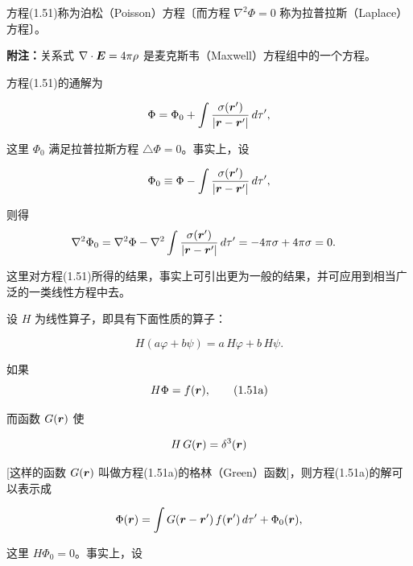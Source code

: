 方程(1.51)称为泊松（Poisson）方程〔而方程 $\nabla^{2}\Phi = 0$ 称为拉普拉斯（Laplace）方程〕。

\textbf{附注：}关系式 $\nabla \cdot \bm{E} = 4\pi\rho$ 是麦克斯韦（Maxwell）方程组中的一个方程。

方程(1.51)的通解为

\begin{equation*}
\Phi = \Phi_0 + \int \frac{\sigma(\bm{r}')}{|\bm{r} - \bm{r}'|}\, d\tau',
\end{equation*}

这里 $\Phi_0$ 满足拉普拉斯方程 $\triangle\Phi = 0$。事实上，设

\begin{equation*}
\Phi_0 \equiv \Phi - \int \frac{\sigma(\bm{r}')}{|\bm{r} - \bm{r}'|}\, d\tau',
\end{equation*}

则得
\begin{equation*}
\begin{aligned}
\nabla^{2}\Phi_0 &= \nabla^{2}\Phi - \nabla^{2} \int \frac{\sigma(\bm{r}')}{|\bm{r} - \bm{r}'|}\, d\tau' = -4\pi\sigma + 4\pi\sigma = 0.
\end{aligned}
\end{equation*}

这里对方程(1.51)所得的结果，事实上可引出更为一般的结果，并可应用到相当广泛的一类线性方程中去。

设 $H$ 为线性算子，即具有下面性质的算子：

\begin{equation*}
H(a\varphi + b\psi) = a\, H\varphi + b\, H\psi.
\end{equation*}

如果
\begin{equation}
H\Phi = f(\bm{r}),
\tag{1.51a}
\end{equation}

而函数 $G(\bm{r})$ 使

\begin{equation*}
H\, G(\bm{r}) = \delta^{3}(\bm{r})
\end{equation*}

[这样的函数 $G(\bm{r})$ 叫做方程(1.51a)的格林（Green）函数]，则方程(1.51a)的解可以表示成

\begin{equation*}
\Phi(\bm{r}) = \int G(\bm{r} - \bm{r}')\, f(\bm{r}')\, d\tau' + \Phi_0(\bm{r}),
\end{equation*}

这里 $H\Phi_0 = 0$。事实上，设

